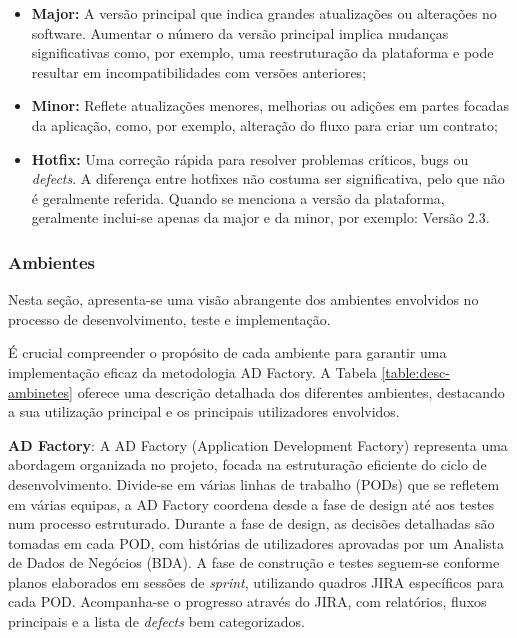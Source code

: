             \begin{itemize}
                \item \textbf{Major:} A versão principal que indica grandes atualizações ou alterações no software. Aumentar o número da versão principal implica mudanças significativas como, por exemplo, uma reestruturação da plataforma e pode resultar em incompatibilidades com versões anteriores;

                \item \textbf{Minor:} Reflete atualizações menores, melhorias ou adições em partes focadas da aplicação, como, por exemplo, alteração do fluxo para criar um contrato;

                \item \textbf{Hotfix:} Uma correção rápida para resolver problemas críticos, bugs ou \textit{defects}. A diferença entre hotfixes não costuma ser significativa, pelo que não é geralmente referida. Quando se menciona a versão da plataforma, geralmente inclui-se apenas da major e da minor, por exemplo: Versão 2.3.
                
            \end{itemize}
            
            \subsubsection{Ambientes}\label{secsec:ambientes}

                Nesta seção, apresenta-se uma visão abrangente dos ambientes envolvidos no processo de desenvolvimento, teste e implementação.

                É crucial compreender o propósito de cada ambiente para garantir uma implementação eficaz da metodologia AD Factory. A Tabela \ref{table:desc-ambinetes} oferece uma descrição detalhada dos diferentes ambientes, destacando a sua utilização principal e os principais utilizadores envolvidos.

                \textbf{AD Factory}: A AD Factory (Application Development Factory) representa uma abordagem organizada no projeto, focada na estruturação eficiente do ciclo de desenvolvimento. Divide-se em várias linhas de trabalho (PODs) que se refletem em várias equipas, a AD Factory coordena desde a fase de design até aos testes num processo estruturado. Durante a fase de design, as decisões detalhadas são tomadas em cada POD, com histórias de utilizadores aprovadas por um Analista de Dados de Negócios (BDA). A fase de construção e testes seguem-se conforme planos elaborados em sessões de \textit{sprint}, utilizando quadros JIRA específicos para cada POD. Acompanha-se o progresso através do JIRA, com relatórios, fluxos principais e a lista de \textit{defects} bem categorizados.

